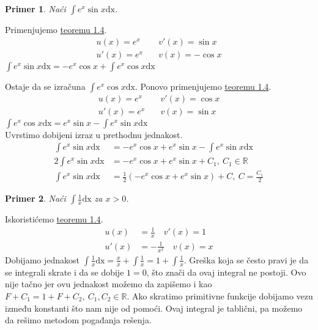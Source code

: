 \documentclass{article}
\newtheorem{prim}{Primer}[section]
\begin{document}
\begin{primbox}
    \begin{prim}
        Naći $\int e^x \sin x \text{dx}$.
    \end{prim}
    Primenjujemo \hyperref[teorema_1.4]{teoremu 1.4}.
    \begin{align*}
        u(x) = e^x  & \quad v'(x) = \sin x \\
        u'(x) = e^x & \quad v(x) = -\cos x
    \end{align*}
    $\int e^x\sin x \text{dx} = -e^x\cos x + \int e^x \cos x\text{dx} $\par
    Ostaje da se izračuna $\int e^x\cos x \text{dx}$. Ponovo primenjujemo \hyperref[teorema_1.4]{teoremu 1.4}.
    \begin{align*}
        u(x) = e^x  & \quad v'(x) = \cos x \\
        u'(x) = e^x & \quad v(x) = \sin x
    \end{align*}
    $\int e^x\cos x \text{dx} = e^x\sin x - \int e^x\sin x \text{dx}$\\
    Uvrstimo dobijeni izraz u prethodnu jednakost.
    \begin{align*}
        \int e^x \sin x \text{dx}  & = -e^x\cos x + e^x \sin x - \int e^x \sin x \text{dx}      \\
        2\int e^x \sin x \text{dx} & = -e^x\cos x + e^x \sin x +C_1,\ C_1\in\mathbb{R}          \\
        \int e^x \sin x \text{dx}  & = \frac{1}{2}(-e^x\cos x + e^x \sin x)+C,\ C=\frac{C_1}{2}
    \end{align*}
\end{primbox}

\begin{primbox}
    \begin{prim}
        Naći $\int \frac{1}{x} \text{dx}$ za $x > 0$.
    \end{prim}
    Iskoristićemo \hyperref[teorema_1.4]{teoremu 1.4}.
    \begin{align*}
        u(x)  & = \frac{1}{x}\quad v'(x)   = 1 \\
        u'(x) & = -\frac{1}{x^2}\quad v(x) = x
    \end{align*}
    Dobijamo jednakost $\int \frac{1}{x} \text{dx} = \frac{x}{x} + \int \frac{1}{x} = 1+ \int\frac{1}{x}$. Greška koja se
    često pravi je da se integrali skrate i da se dobije $1 = 0$, što znači da ovaj integral ne postoji.
    Ovo nije tačno jer ovu jednakost možemo da zapišemo i kao $F+C_1 = 1+F+C_2,\ C_1,C_2\in\mathbb{R}$.
    Ako skratimo primitivne funkcije dobijamo vezu između konstanti što nam nije od pomoći. Ovaj integral
    je tablični, pa možemo da rešimo metodom pogađanja rešenja.
\end{primbox}
\end{document}

